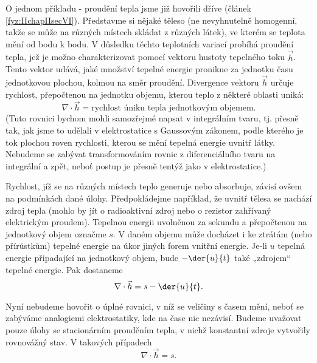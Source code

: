     O jednom příkladu - proudění tepla jsme již hovořili dříve (článek \ref{fyz:IIchapIIsecVI}).
    Představme si nějaké těleso (ne nevyhnutelně homogenní, takže se může na různých místech skládat
    z různých látek), ve kterém se teplota mění od bodu k bodu. V důsledku těchto teplotních variací
    probíhá proudění tepla, jež je možno charakterizovat pomocí vektoru hustoty tepelného toku
    \(\vec{h}\). Tento vektor udává, jaké množství tepelné energie pronikne za jednotku času
    jednotkovou plochou, kolmou na směr proudění. Divergence vektoru \(\vec{h}\) určuje rychlost,
    přepočtenou na jednotku objemu, kterou teplo z některé oblasti uniká:
    \begin{equation*}
      \nabla\cdot\vec{h} = \text{rychlost úniku tepla jednotkovým objemem.}
    \end{equation*}
    (Tuto rovnici bychom mohli samozřejmé napsat v integrálním tvaru, tj. přesně tak, jak jsme to
    udělali v elektrostatice s Gaussovým zákonem, podle kterého je tok plochou roven rychlosti,
    kterou se mění tepelná energie uvnitř látky. Nebudeme se zabývat transformováním rovnic z
    diferenciálního tvaru na integrální a zpět, neboť postup je přesně tentýž jako v
    elektrostatice.)

    Rychlost, jíž se na různých místech teplo generuje nebo absorbuje, závisí ovšem na podmín­kách
    dané úlohy. Předpokládejme například, že uvnitř tělesa se nachází zdroj tepla (mohlo by jít o
    radioaktivní zdroj nebo o rezistor zahřívaný elektrickým proudem). Tepelnou energii uvolněnou za
    sekundu a přepočtenou na jednotkový objem označme \(s\). V daném objemu může docházet i ke
    ztrátám (nebo přírůstkům) tepelné energie na úkor jiných forem vnitřní energie. Je-li \(u\)
    tepelná energie připadající na jednotkový objem, bude \(-\der{u}{t}\) také „zdrojem“ tepelné
    energie. Pak dostaneme
    \begin{equation}\label{fyz:eq760}
      \nabla\cdot\vec{h} = s - \der{u}{t}.
    \end{equation}

    Nyní nebudeme hovořit o úplné rovnici, v níž se veličiny s časem mění, neboť se zabýváme 
    analogiemi elektrostatiky, kde na čase nic nezávisí. Budeme uvažovat pouze úlohy se stacionárním
    prouděním tepla, v nichž konstantní zdroje vytvořily rovnovážný stav. V takových případech
    \begin{equation}\label{fyz:eq761}
      \nabla\cdot\vec{h} = s.
    \end{equation}

